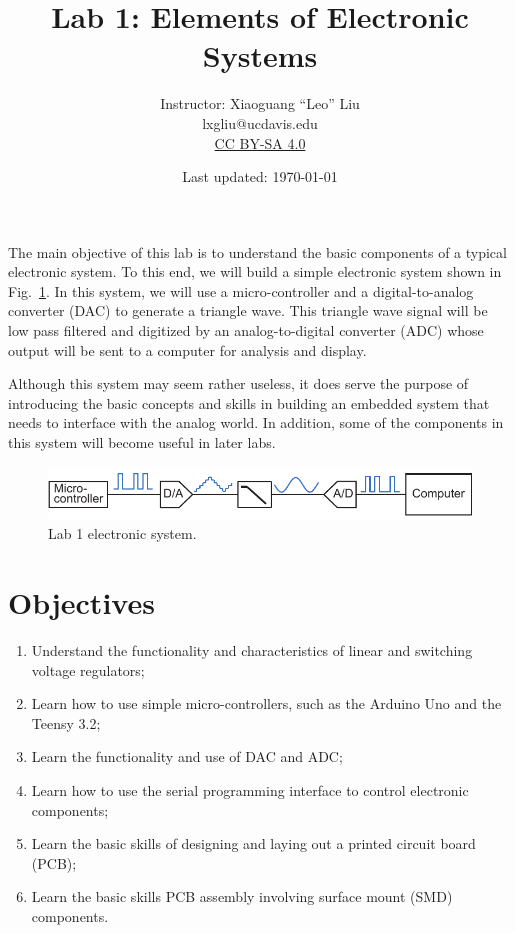 \documentclass[letterpaper, 11pt]{article}
\begin{document}
\title{Lab 1: Elements of Electronic Systems}
\author{Instructor: Xiaoguang ``Leo'' Liu\\lxgliu@ucdavis.edu \\
	\small \href{http://creativecommons.org/licenses/by-sa/4.0/}{CC BY-SA 4.0}}
\date{Last updated: \today}

\maketitle

The main objective of this lab is to understand the basic components of a typical electronic system. To this end, we will build a simple electronic system shown in Fig.~\ref{fig:lab1-system}. In this system, we will use a micro-controller and a digital-to-analog converter (DAC) to generate a triangle wave. This triangle wave signal will be low pass filtered and digitized by an analog-to-digital converter (ADC) whose output will be sent to a computer for analysis and display.

Although this system may seem rather useless, it does serve the purpose of introducing the basic concepts and skills in building an embedded system that needs to interface with the analog world. In addition, some of the components in this system will become useful in later labs. 

\begin{figure}[h]
	\centering
	\includegraphics{lab1-system}
	\caption{Lab 1 electronic system.}
	\label{fig:lab1-system}
\end{figure}

\section{Objectives}

\begin{enumerate}[itemsep=0.1ex]
	\item Understand the functionality and characteristics of linear and switching voltage regulators;
	\item Learn how to use simple micro-controllers, such as the Arduino Uno and the Teensy 3.2;
	\item Learn the functionality and use of DAC and ADC;
	\item Learn how to use the serial programming interface to control electronic components;
	\item Learn the basic skills of designing and laying out a printed circuit board (PCB);
	\item Learn the basic skills PCB assembly involving surface mount (SMD) components.
\end{enumerate}
\end{document}
